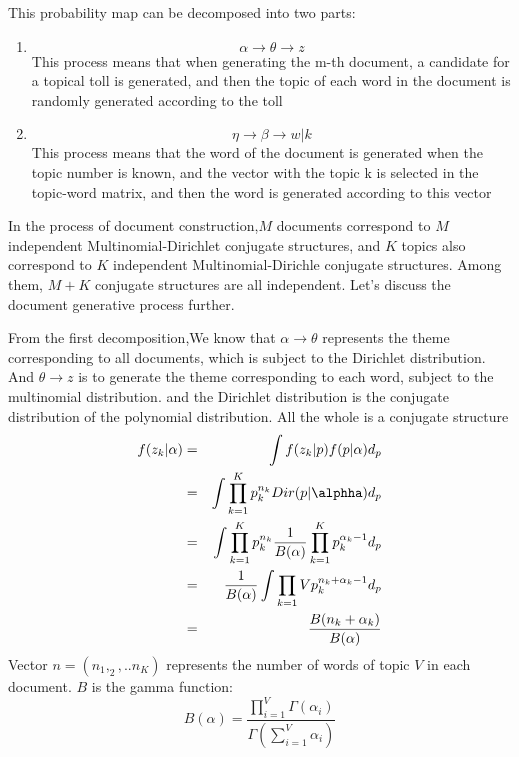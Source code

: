 This probability map can be decomposed into two parts:
\begin{enumerate}
  \item $$\alpha \rightarrow \theta  \rightarrow z $$
This process means that when generating the m-th document, a candidate for a topical toll is generated, and then the topic of each word in the document is randomly generated according to the toll
  \item $$\eta \rightarrow \beta  \rightarrow w|k $$This process means that the word of the document is generated when the topic number is known, and the vector with the topic k is selected in the topic-word matrix, and then the word is generated according to this vector
\end{enumerate}

In the process of document construction,$ M$ documents correspond to $M$ independent Multinomial-Dirichlet conjugate structures, and $K$ topics also correspond to $K$ independent Multinomial-Dirichle conjugate structures. Among them, $M+K$ conjugate structures are all independent. Let’s discuss the document generative process further.


From the first decomposition\cite{coolaps},We know that $\alpha \rightarrow \theta$ represents the theme corresponding to all documents, which is subject to the Dirichlet distribution. And $\theta  \rightarrow z$  is to generate the theme corresponding to each word, subject to the multinomial distribution. and the Dirichlet distribution is the conjugate distribution of the polynomial distribution. All the whole is a conjugate structure
\begin{eqnarray*}
  f(z_k|\alpha) &=& \int f(z_k|p)f(p|\alpha) d_p \\
              &=& \int \prod_{k=1}^K p_k^{n_k} Dir(p|\alphha) d_p \\
              &=& \int \prod_{k=1}^K p_k^{n_k} \frac{1}{B(\alpha)}\prod_{k=1}^{K}p_k^{\alpha_k-1} d_p \\
              &=& \frac{1}{B(\alpha)}\int \prod_{k=1}{V}p_k^{n_k+\alpha_k-1} d_p \\
              &=& \frac{B(n_k+\alpha_k)}{B(\alpha)}
\end{eqnarray*}
Vector $n = (n_1,_2,..n_K)$ represents the number of words of topic $V$ in each document.
$B$ is the gamma function:
\[
  B(\alpha) = \frac{\prod_{i=1}^V\Gamma(\alpha_i)}{\Gamma(\sum_{i=1}^V \alpha_i)}
\]

